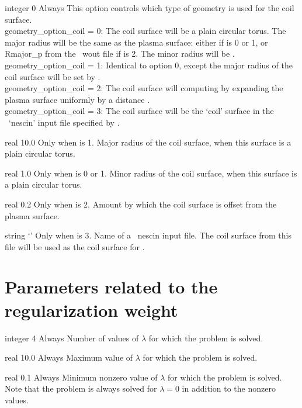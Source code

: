 {integer}
{0}
{Always}
{This option controls which type of geometry is used for the coil surface.\\

{\ttfamily geometry\_option\_coil} = 0: The coil surface will be a plain circular torus. The major radius will be the 
same as the plasma surface: either  if  is 0 or 1, or {\ttfamily Rmajor\_p} from the \vmec~{\ttfamily wout} file
if   is 2.
     The minor radius will be .\\

{\ttfamily geometry\_option\_coil} = 1: Identical to option 0, except the major radius of the coil surface will be set by .\\

{\ttfamily geometry\_option\_coil} = 2: The coil surface will computing by expanding the plasma surface uniformly by a distance .\\

{\ttfamily geometry\_option\_coil} = 3: The coil surface will be the `coil' surface in the \nescoil~`nescin' input file specified by .
}

\myhrule

{real}
{10.0}
{Only when  is 1.}
{Major radius of the coil surface, when this surface is a plain circular torus.}

\myhrule

{real}
{1.0}
{Only when  is 0 or 1.}
{Minor radius of the coil surface, when this surface is a plain circular torus.}


\myhrule

{real}
{0.2}
{Only when  is 2.}
{Amount by which the coil surface is offset from the plasma surface.}

\myhrule

{string}
{`'}
{Only when  is 3.}
{Name of a \nescoil~{\ttfamily nescin} input file. The coil surface from
this file will be used as the coil surface for \regcoil.}


\section{Parameters related to the regularization weight}

{integer}
{4}
{Always}
{Number of values of $\lambda$ for which the problem is solved.}

\myhrule

{real}
{10.0}
{Always}
{Maximum value of $\lambda$ for which the problem is solved.}

\myhrule

{real}
{0.1}
{Always}
{Minimum nonzero value of $\lambda$ for which the problem is solved.
Note that the problem is always solved for $\lambda=0$ in addition to
the nonzero values.}

